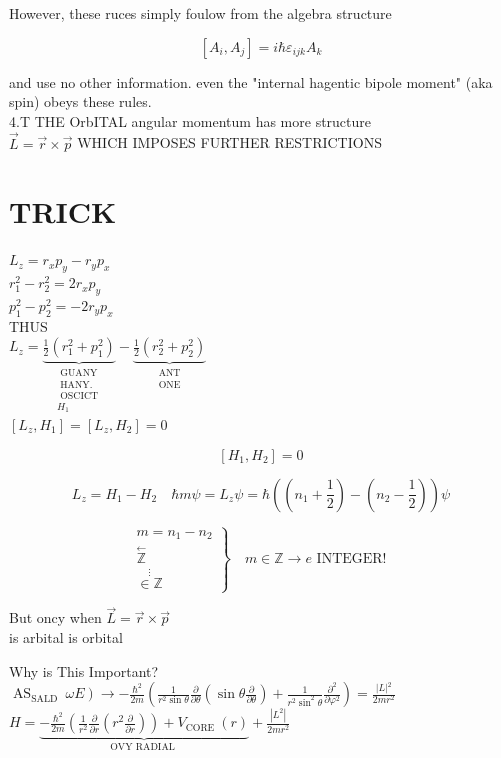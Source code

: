 \documentclass[10pt]{article}
\begin{document}
However, these ruces simply foulow from the algebra structure

$$
\left[A_{i}, A_{j}\right]=i \hbar \varepsilon_{i j k} A_{k}
$$

and use no other information. even the "internal hagentic bipole moment" (aka spin) obeys these rules.\\
4.T THE OrbITAL angular momentum has more structure\\
$\vec{L}=\vec{r} \times \vec{p}$ WHICH IMPOSES FURTHER RESTRICTIONS

\section*{TRICK}
$L_{z}=r_{x} p_{y}-r_{y} p_{x}$\\
$r_{1}^{2}-r_{2}^{2}=2 r_{x} p_{y}$\\
$p_{1}^{2}-p_{2}^{2}=-2 r_{y} p_{x}$\\
THUS\\
$L_{z}=\underbrace{\frac{1}{2}\left(r_{1}^{2}+p_{1}^{2}\right)}_{\substack{\text { GUANY } \\ \text { HANY. } \\ \text { OSCICT } \\ H_{1}}}-\underbrace{\frac{1}{2}\left(r_{2}^{2}+p_{2}^{2}\right)}_{\substack{\text { ANT } \\ \text { ONE }}}$\\
$\left[L_{z}, H_{1}\right]=\left[L_{z}, H_{2}\right]=0$

$$
\left[H_{1}, H_{2}\right]=0
$$

$$
L_{z}=H_{1}-H_{2} \quad \hbar m \psi=L_{z} \psi=\hbar\left(\left(n_{1}+\frac{1}{2}\right)-\left(n_{2}-\frac{1}{2}\right)\right) \psi
$$

$$
\left.\begin{array}{c}
m=n_{1}-n_{2} \\
\stackrel{\leftarrow}{\mathbb{Z}} \\
\stackrel{\vdots}{\in \mathbb{Z}}
\end{array}\right\} \quad m \in \mathbb{Z} \rightarrow e \text { INTEGER! }
$$

But oncy when $\vec{L}=\vec{r} \times \vec{p}$\\
is arbital is orbital

Why is This Important?\\
$\left.\operatorname{AS}_{\text {SALD }} \omega E\right) \rightarrow-\frac{\hbar^{2}}{2 m}\left(\frac{1}{r^{2} \sin \theta} \frac{\partial}{\partial \theta}\left(\sin \theta \frac{\partial}{\partial \theta}\right)+\frac{1}{r^{2} \sin ^{2} \theta} \frac{\partial^{2}}{\partial \varphi^{2}}\right)=\frac{|L|{ }^{2}}{2 m r^{2}}$\\
$H=\underbrace{-\frac{\hbar^{2}}{2 m}\left(\frac{1}{r^{2}} \frac{\partial}{\partial r}\left(r^{2} \frac{\partial}{\partial r}\right)\right)+V_{\text {CORE }}(r)}_{\text {OVY RADIAL }}+\frac{\left|L^{2}\right|}{2 m r^{2}}$
\end{document}
